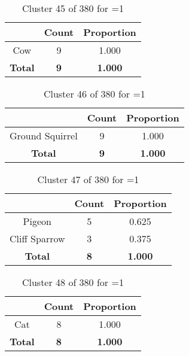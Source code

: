 \begin{table}[ht!]
\centering
\begin{tabular}{|c|c|c|}
\hline
\bf \Spec{} &\bf Count &\bf Proportion\\ \hline \hline
Cow & 9 & 1.000\\ \hline
\hline
\bf Total & \bf 9 & \bf 1.000\\ \hline
\end{tabular}
\label{tab:cluster:45:1}
\caption{Cluster 45 of 380 for \minneigh{}=1}
\end{table}

\begin{table}[ht!]
\centering
\begin{tabular}{|c|c|c|}
\hline
\bf \Spec{} &\bf Count &\bf Proportion\\ \hline \hline
Ground Squirrel & 9 & 1.000\\ \hline
\hline
\bf Total & \bf 9 & \bf 1.000\\ \hline
\end{tabular}
\label{tab:cluster:46:1}
\caption{Cluster 46 of 380 for \minneigh{}=1}
\end{table}

\begin{table}[ht!]
\centering
\begin{tabular}{|c|c|c|}
\hline
\bf \Spec{} &\bf Count &\bf Proportion\\ \hline \hline
Pigeon & 5 & 0.625\\ \hline
Cliff Sparrow & 3 & 0.375\\ \hline
\hline
\bf Total & \bf 8 & \bf 1.000\\ \hline
\end{tabular}
\label{tab:cluster:47:1}
\caption{Cluster 47 of 380 for \minneigh{}=1}
\end{table}

\begin{table}[ht!]
\centering
\begin{tabular}{|c|c|c|}
\hline
\bf \Spec{} &\bf Count &\bf Proportion\\ \hline \hline
Cat & 8 & 1.000\\ \hline
\hline
\bf Total & \bf 8 & \bf 1.000\\ \hline
\end{tabular}
\label{tab:cluster:48:1}
\caption{Cluster 48 of 380 for \minneigh{}=1}
\end{table}

